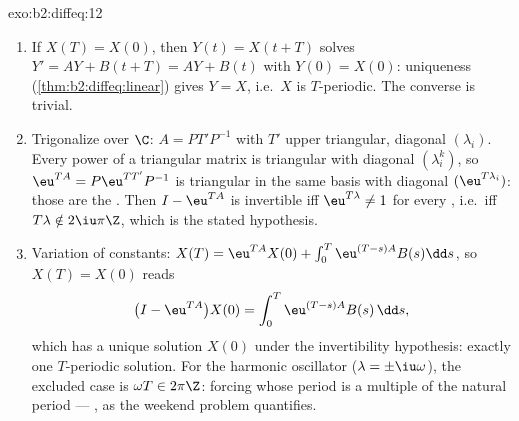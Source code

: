 \begin{solution}{exo:b2:diffeq:12}
\begin{enumerate}
  \item If $X(T) = X(0)$, then $Y(t) = X(t + T)$ solves $Y' =
        AY + B(t + T) = AY + B(t)$ with $Y(0) = X(0)$:
        uniqueness (\cref{thm:b2:diffeq:linear}) gives $Y = X$,
        i.e.\ $X$ is $T$-periodic. The converse is trivial.
  \item Trigonalize over $\C$: $A = PT'P^{-1}$ with $T'$ upper
        triangular, diagonal $(\lambda_i)$. Every power of a
        triangular matrix is triangular with diagonal
        $(\lambda_i^k)$, so $\eu^{TA} = P\eu^{TT'}P^{-1}$ is
        triangular in the same basis with diagonal
        $(\eu^{T\lambda_i})$: those are the . Then
        $I - \eu^{TA}$ is invertible iff $\eu^{T\lambda} \neq
        1$ for every , i.e.\ iff $T\lambda \notin
        2\iu\pi\Z$, which is the stated hypothesis.
  \item Variation of constants: $X(T) = \eu^{TA}X(0) +
        \int_0^T\eu^{(T-s)A}B(s)\dd s$, so $X(T) = X(0)$ reads
        \[
        \bigl(I - \eu^{TA}\bigr)X(0) =
        \int_0^{T}\eu^{(T-s)A}B(s)\,\dd s ,
        \]
        which has a unique solution $X(0)$ under the
        invertibility hypothesis: exactly one $T$-periodic
        solution. For the harmonic oscillator ($\lambda =
        \pm\iu\omega$), the excluded case is $\omega T \in
        2\pi\Z$: forcing whose period is a multiple of the
        natural period --- , as the weekend problem
        quantifies.
\end{enumerate}
\end{solution}

